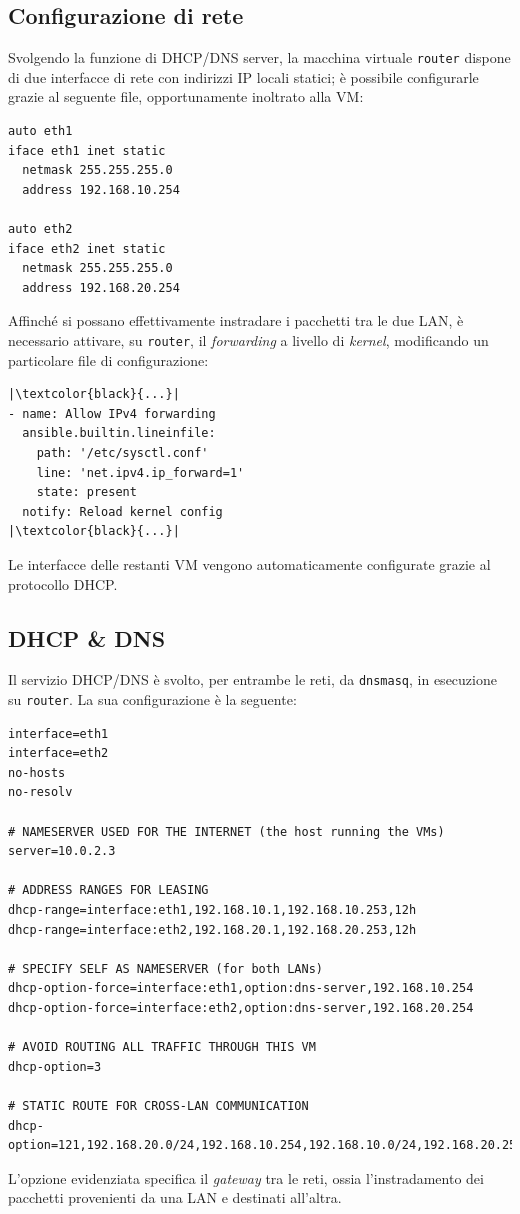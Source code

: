 \documentclass[12pt,a4paper,twoside,openright]{book}
\begin{document}
\subsection{Configurazione di rete}
Svolgendo la funzione di \ac{DHCP}/\ac{DNS} server, la macchina virtuale \texttt{router} dispone di due interfacce di rete con indirizzi \ac{IP} locali statici; è possibile configurarle grazie al seguente file, opportunamente inoltrato alla \ac{VM}:
\begin{verbatim}
auto eth1
iface eth1 inet static
  netmask 255.255.255.0
  address 192.168.10.254

auto eth2
iface eth2 inet static
  netmask 255.255.255.0
  address 192.168.20.254
\end{verbatim}
Affinché si possano effettivamente instradare i pacchetti tra le due \ac{LAN}, è necessario attivare, su \texttt{router}, il \textit{forwarding} a livello di \textit{kernel}, modificando un particolare file di configurazione:
\begin{verbatim}
|\textcolor{black}{...}|
- name: Allow IPv4 forwarding
  ansible.builtin.lineinfile:
    path: '/etc/sysctl.conf'
    line: 'net.ipv4.ip_forward=1'
    state: present
  notify: Reload kernel config
|\textcolor{black}{...}|
\end{verbatim}
Le interfacce delle restanti \ac{VM} vengono automaticamente configurate grazie al protocollo \ac{DHCP}.

\subsection{DHCP \& DNS}
Il servizio \ac{DHCP}/\ac{DNS} è svolto, per entrambe le reti, da \texttt{dnsmasq}, in esecuzione su \texttt{router}. La sua configurazione è la seguente:
\begin{verbatim}
interface=eth1
interface=eth2
no-hosts
no-resolv

# NAMESERVER USED FOR THE INTERNET (the host running the VMs)
server=10.0.2.3

# ADDRESS RANGES FOR LEASING
dhcp-range=interface:eth1,192.168.10.1,192.168.10.253,12h
dhcp-range=interface:eth2,192.168.20.1,192.168.20.253,12h

# SPECIFY SELF AS NAMESERVER (for both LANs)
dhcp-option-force=interface:eth1,option:dns-server,192.168.10.254
dhcp-option-force=interface:eth2,option:dns-server,192.168.20.254

# AVOID ROUTING ALL TRAFFIC THROUGH THIS VM
dhcp-option=3

# STATIC ROUTE FOR CROSS-LAN COMMUNICATION
dhcp-option=121,192.168.20.0/24,192.168.10.254,192.168.10.0/24,192.168.20.254
\end{verbatim}
L'opzione evidenziata specifica il \textit{gateway} tra le reti, ossia l'instradamento dei pacchetti provenienti da una \ac{LAN} e destinati all'altra.
\end{document}
